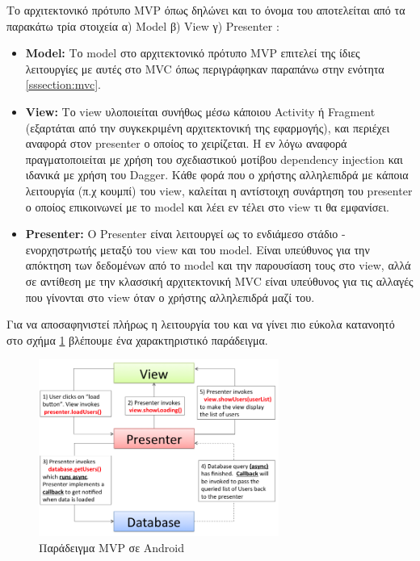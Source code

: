 	Το αρχιτεκτονικό πρότυπο MVP όπως δηλώνει και το όνομα του αποτελείται από τα παρακάτω τρία στοιχεία α) Model β) View γ) Presenter :
	\begin{itemize}
		\item \textbf{Model: } Το model στο αρχιτεκτονικό πρότυπο MVP επιτελεί της ίδιες λειτουργίες με αυτές στο MVC όπως περιγράφηκαν παραπάνω στην ενότητα \ref{sssection:mvc}.
		\item \textbf{View: } Το view υλοποιείται συνήθως μέσω κάποιου Activity ή Fragment (εξαρτάται από την συγκεκριμένη αρχιτεκτονική της εφαρμογής), και περιέχει αναφορά στον presenter ο οποίος το χειρίζεται. H εν λόγω αναφορά πραγματοποιείται με χρήση του σχεδιαστικού μοτίβου dependency injection και ιδανικά με χρήση του Dagger. Κάθε φορά που ο χρήστης αλληλεπιδρά με κάποια λειτουργία (π.χ κουμπί) του view, καλείται η αντίστοιχη συνάρτηση του presenter ο οποίος επικοινωνεί με το model και λέει εν τέλει στο view τι θα εμφανίσει.
		\item \textbf{Presenter: } Ο Presenter είναι λειτουργεί ως το ενδιάμεσο στάδιο - ενορχηστρωτής μεταξύ του view και του model. Είναι υπεύθυνος για την απόκτηση των δεδομένων από το model και την παρουσίαση τους στο view, αλλά σε αντίθεση με την κλασσική αρχιτεκτονική MVC είναι υπεύθυνος για τις αλλαγές που γίνονται στο view όταν ο χρήστης αλληλεπιδρά μαζί του.
	\end{itemize}
	
	Για να αποσαφηνιστεί πλήρως η λειτουργία του και να γίνει πιο εύκολα κατανοητό στο σχήμα \ref{fig:mvp_workflow} βλέπουμε ένα χαρακτηριστικό παράδειγμα.
	
	\begin{figure}[h]
	    \centering
	    \includegraphics[width=0.7\textwidth]{mvp_workflow.png}
	    \caption{Παράδειγμα MVP σε Android}
	    \label{fig:mvp_workflow}
	\end{figure}

